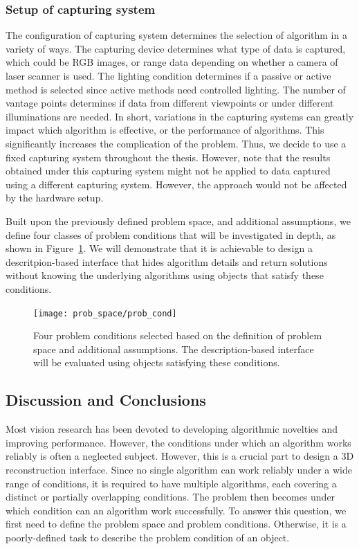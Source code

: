\subsubsection{Setup of capturing system}
The configuration of capturing system determines the selection of algorithm in a variety of ways. The capturing device determines what type of data is captured, which could be RGB images, or range data depending on whether a camera of laser scanner is used. The lighting condition determines if a passive or active method is selected since active methods need controlled lighting. The number of vantage points determines if data from different viewpoints or under different illuminations are needed. In short, variations in the capturing systems can greatly impact which algorithm is effective, or the performance of algorithms. This significantly increases the complication of the problem. Thus, we decide to use a fixed capturing system throughout the thesis. However, note that the results obtained under this capturing system might not be applied to data captured using a different capturing system. However, the approach would not be affected by the hardware setup.

Built upon the previously defined problem space, and additional assumptions, we define four classes of problem conditions that will be investigated in depth, as shown in Figure~\ref{fig:prob_cond}. We will demonstrate that it is achievable to design a descritpion-based interface that hides algorithm details and return solutions without knowing the underlying algorithms using objects that satisfy these conditions.
\begin{figure}[!htbp]
\centering
\texttt{[image: prob\_space/prob\_cond]}
\caption{Four problem conditions selected based on the definition of problem space and additional assumptions. The description-based interface will be evaluated using objects satisfying these conditions.}
\label{fig:prob_cond}
\end{figure}

\subsection{Discussion and Conclusions}
Most vision research has been devoted to developing algorithmic novelties and improving performance. However, the conditions under which an algorithm works reliably is often a neglected subject. However, this is a crucial part to design a 3D reconstruction interface. Since no single algorithm can work reliably under a wide range of conditions, it is required to have multiple algorithms, each covering a distinct or partially overlapping conditions. The problem then becomes under which condition can an algorithm work successfully. To answer this question, we first need to define the problem space and problem conditions. Otherwise, it is a poorly-defined task to describe the problem condition of an object.

